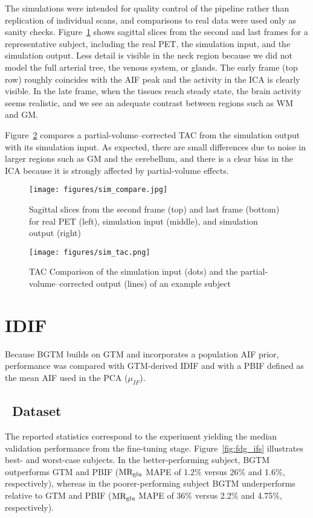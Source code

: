 The simulations were intended for quality control of the pipeline rather than replication of individual scans, and comparisons to real data were used only as sanity checks.
Figure~\ref{fig:sim_compare_imgs} shows sagittal slices from the second and last frames for a representative subject, including the real PET, the simulation input, and the simulation output.
Less detail is visible in the neck region because we did not model the full arterial tree, the venous system, or glands.
The early frame (top row) roughly coincides with the AIF peak and the activity in the ICA is clearly visible. %
In the late frame, when the tissues reach steady state, the brain activity seems realistic, and we see an adequate contrast between regions such as WM and GM. %

Figure~\ref{fig:sim_tac_compare} compares a partial-volume–corrected TAC from the simulation output with its simulation input.
As expected, there are small differences due to noise in larger regions such as GM and the cerebellum, and there is a clear bias in the ICA because it is strongly affected by partial-volume effects.

\begin{figure}[h]
	\centering
	\texttt{[image: figures/sim\_compare.jpg]}
	\caption{Sagittal slices from the second frame (top) and last frame (bottom) for real PET (left), simulation input (middle), and simulation output (right)}
	\label{fig:sim_compare_imgs}
\end{figure}

\begin{figure}[h]
	\centering
	\texttt{[image: figures/sim\_tac.png]}
	\caption{TAC Comparison of the simulation input (dots) and the partial-volume–corrected output (lines) of an example subject}
	\label{fig:sim_tac_compare}
\end{figure}

\section{IDIF}
Because BGTM builds on GTM and incorporates a population AIF prior, performance was compared with GTM-derived IDIF and with a PBIF defined as the mean AIF used in the PCA (\(\mu_{IF}\)).

\subsection{\fdg\ Dataset}
The reported statistics correspond to the experiment yielding the median validation performance from the fine-tuning stage.
Figure~\ref{fig:fdg_ifs} illustrates best- and worst-case subjects.
In the better-performing subject, BGTM outperforms GTM and PBIF (\(\text{MR}_{\text{glu}}\) MAPE of 1.2\% versus 26\% and 1.6\%, respectively), whereas in the poorer-performing subject BGTM underperforms relative to GTM and PBIF (\(\text{MR}_{\text{glu}}\) MAPE of 36\% versus 2.2\% and 4.75\%, respectively).


